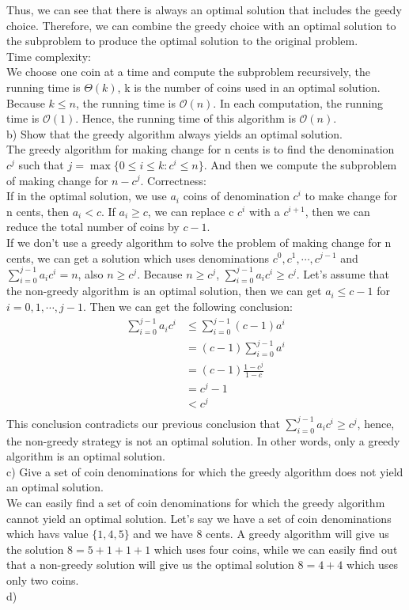 \documentclass[12pt,letterpaper]{article}
\begin{document}
Thus, we can see that there is always an optimal solution that includes the geedy choice. Therefore, we can combine the greedy choice with an optimal solution to the subproblem to produce the optimal solution to the original problem. \\
Time complexity: \\
We choose one coin at a time and compute the subproblem recursively, the running time is $\Theta(k)$, k is the number of coins used in an optimal solution. Because $k \le n$, the running time is $\mathcal{O}(n)$. In each computation, the running time is $\mathcal{O}(1)$. Hence, the running time of this algorithm is $\mathcal{O}(n).$ \\ 
b) Show that the greedy algorithm always yields an optimal solution. \\
The greedy algorithm for making change for n cents is to find the denomination $c^j$ such that $j = \max \{0 \le i \le k: c^i \le n \}$. And then we compute the subproblem of making change for $n - c^j$. 
Correctness: \\
If in the optimal solution, we use $a_i$ coins of denomination $c^i$ to make change for n cents, then $a_i < c$. If $a_i \ge c$, we can replace c $c^i$ with a $c^{i+1}$, then we can reduce the total number of coins by $c-1$. \\
If we don't use a greedy algorithm to solve the problem of making change for n cents, we can get a solution which uses denominations $c^0,c^1,\cdots,c^{j-1}$ and $\sum _{i=0} ^{j-1} a_i c^i = n$, also $n \ge c^j$. Because $n \ge c^j$, $\sum _{i=0} ^{j-1} a_i c^i \ge c^j$. Let's assume that the non-greedy algorithm is an optimal solution, then we can get $a_i \le c-1$ for $i = 0,1,\cdots,j-1$. Then we can get the following conclusion: \\
\begin{align*}
\sum _{i=0} ^{j-1} a_i c^i &\le \sum _{i=0} ^{j-1} (c-1) a^i \\
&= (c-1) \sum _{i=0} ^{j-1} a^i \\
&= (c-1) \frac{1 - c^j}{1-c} \\
&= c^j - 1 \\
&< c^j \\
\end{align*}
This conclusion contradicts our previous conclusion that $\sum _{i=0} ^{j-1} a_i c^i \ge c^j$, hence, the non-greedy strategy is not an optimal solution. In other words, only a greedy algorithm is an optimal solution. \\
c) Give a set of coin denominations for which the greedy algorithm does not yield an optimal solution. \\
We can easily find a set of coin denominations for which the greedy algorithm cannot yield an optimal solution. Let's say we have a set of coin denominations which havs value $\{1, 4, 5 \}$ and we have 8 cents. A greedy algorithm will give us the solution $8 = 5 + 1 + 1 + 1$ which uses four coins, while we can easily find out that a non-greedy solution will give us the optimal solution $8 = 4 + 4$ which uses only two coins. \\
d)
\end{document}
